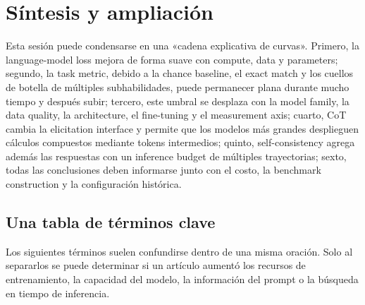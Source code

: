 \section{Síntesis y ampliación}

Esta sesión puede condensarse en una «cadena explicativa de curvas». Primero, la language-model loss mejora de forma suave con compute, data y parameters; segundo, la task metric, debido a la chance baseline, el exact match y los cuellos de botella de múltiples subhabilidades, puede permanecer plana durante mucho tiempo y después subir; tercero, este umbral se desplaza con la model family, la data quality, la architecture, el fine-tuning y el measurement axis; cuarto, CoT cambia la elicitation interface y permite que los modelos más grandes desplieguen cálculos compuestos mediante tokens intermedios; quinto, self-consistency agrega además las respuestas con un inference budget de múltiples trayectorias; sexto, todas las conclusiones deben informarse junto con el costo, la benchmark construction y la configuración histórica.

\subsection{Una tabla de términos clave}

Los siguientes términos suelen confundirse dentro de una misma oración. Solo al separarlos se puede determinar si un artículo aumentó los recursos de entrenamiento, la capacidad del modelo, la información del prompt o la búsqueda en tiempo de inferencia.

